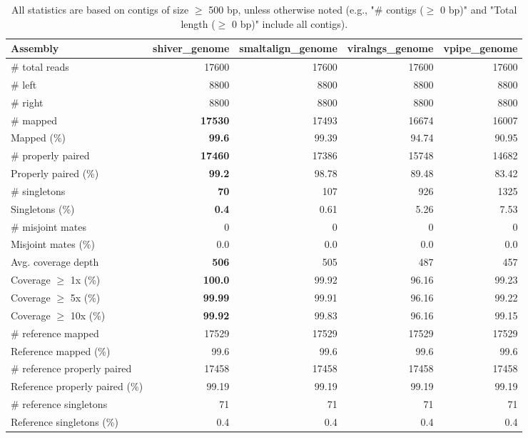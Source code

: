 \documentclass[12pt,a4paper]{article}
\begin{document}
\begin{table}[ht]
\begin{center}
\caption{All statistics are based on contigs of size $\geq$ 500 bp, unless otherwise noted (e.g., "\# contigs ($\geq$ 0 bp)" and "Total length ($\geq$ 0 bp)" include all contigs).}
\begin{tabular}{|l*{4}{|r}|}
\hline
Assembly & shiver\_genome & smaltalign\_genome & viralngs\_genome & vpipe\_genome \\ \hline
\# total reads & 17600 & 17600 & 17600 & 17600 \\ \hline
\# left & 8800 & 8800 & 8800 & 8800 \\ \hline
\# right & 8800 & 8800 & 8800 & 8800 \\ \hline
\# mapped & {\bf 17530} & 17493 & 16674 & 16007 \\ \hline
Mapped (\%) & {\bf 99.6} & 99.39 & 94.74 & 90.95 \\ \hline
\# properly paired & {\bf 17460} & 17386 & 15748 & 14682 \\ \hline
Properly paired (\%) & {\bf 99.2} & 98.78 & 89.48 & 83.42 \\ \hline
\# singletons & {\bf 70} & 107 & 926 & 1325 \\ \hline
Singletons (\%) & {\bf 0.4} & 0.61 & 5.26 & 7.53 \\ \hline
\# misjoint mates & 0 & 0 & 0 & 0 \\ \hline
Misjoint mates (\%) & 0.0 & 0.0 & 0.0 & 0.0 \\ \hline
Avg. coverage depth & {\bf 506} & 505 & 487 & 457 \\ \hline
Coverage $\geq$ 1x (\%) & {\bf 100.0} & 99.92 & 96.16 & 99.23 \\ \hline
Coverage $\geq$ 5x (\%) & {\bf 99.99} & 99.91 & 96.16 & 99.22 \\ \hline
Coverage $\geq$ 10x (\%) & {\bf 99.92} & 99.83 & 96.16 & 99.15 \\ \hline
\# reference mapped & 17529 & 17529 & 17529 & 17529 \\ \hline
Reference mapped (\%) & 99.6 & 99.6 & 99.6 & 99.6 \\ \hline
\# reference properly paired & 17458 & 17458 & 17458 & 17458 \\ \hline
Reference properly paired (\%) & 99.19 & 99.19 & 99.19 & 99.19 \\ \hline
\# reference singletons & 71 & 71 & 71 & 71 \\ \hline
Reference singletons (\%) & 0.4 & 0.4 & 0.4 & 0.4 \\ \hline

\end{tabular}
\end{center}
\end{table}
\end{document}
